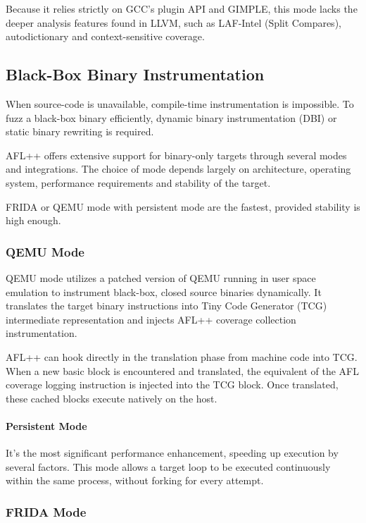 Because it relies strictly on GCC's plugin API and GIMPLE, this mode lacks the deeper analysis features found in LLVM, such as LAF-Intel (Split Compares), autodictionary and context-sensitive coverage.

\subsection{Black-Box Binary Instrumentation}
\label{subsec:bbb-instr}

When source-code is unavailable, compile-time instrumentation is impossible. To fuzz a black-box binary efficiently, dynamic binary instrumentation (DBI) or static binary rewriting is required. 

AFL++ offers extensive support for binary-only targets through several modes and integrations. The choice of mode depends largely on architecture, operating system, performance requirements and stability of the target. 

FRIDA or QEMU mode with persistent mode are the fastest, provided stability is high enough.

\subsubsection{QEMU Mode}

QEMU mode utilizes a patched version of QEMU running in user space emulation to instrument black-box, closed source binaries dynamically. It translates the target binary instructions into Tiny Code Generator (TCG) intermediate representation and injects AFL++ coverage collection instrumentation.

AFL++ can hook directly in the translation phase from machine code into TCG. When a new basic block is encountered and translated, the equivalent of the AFL coverage logging instruction is injected into the TCG block. Once translated, these cached blocks execute natively on the host.

\paragraph{Persistent Mode} It's the most significant performance enhancement, speeding up execution by several factors. This mode allows a target loop to be executed continuously within the same process, without forking for every attempt.

\subsubsection{FRIDA Mode}

